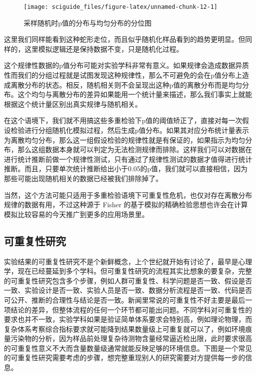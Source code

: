 \documentclass[]{tufte-book}
\begin{document}
\begin{figure}
\texttt{[image: sciguide\_files/figure-latex/unnamed-chunk-12-1]} \caption[采样随机时p值的分布与均匀分布的分位图]{采样随机时p值的分布与均匀分布的分位图}\label{fig:unnamed-chunk-12}
\end{figure}

这里我们同样能看到这种蛇形走位，而且似乎随机化样品看到的趋势更明显。但同样的，这里模拟逻辑还是保持数据不变，只是随机化过程。

这个规律性数据的p值分布可能对实验学科非常有意义。如果规律会造成数据异质性而我们的分组过程就是试图发现这种规律性，那么不可避免的会在p值分布上造成离散分布的状态。相反，随机相关则不会呈现出这种p值的离散分布而是均匀分布。这个均匀与离散分布的差异如果能用一个统计量来描述，那么我们事实上就能根据这个统计量区别出真实规律与随机相关。

在这个语境下，我们就不用搞这些多重检验下p值的阈值矫正了，直接对每一次假设检验进行分组随机化模拟过程，然后生成p值分布。如果其对应分布统计量表示为离散均匀分布，那么这一组假设检验的规律性就是有保证的，如果指示为均匀分布，那么这组数据本身就可以判定为无法检测规律而排除。这样我们可以对数据在进行统计推断前做一个规律性测试，只有通过了规律性测试的数据才值得进行统计推断。而且，只要单次统计推断给出小于0.05的p值，我们就可以直接相信，因为那些可能出现随机相关的数据已经被我们排除掉了。

当然，这个方法可能只适用于多重检验语境下可重复性危机，也仅对存在离散分布规律的数据有用，不过这种源于 Fisher 的基于模拟的精确检验思想也许会在计算模拟比较容易的今天推广到更多的应用场景里。

\hypertarget{ux53efux91cdux590dux6027ux7814ux7a76}{%
\subsection{可重复性研究}\label{ux53efux91cdux590dux6027ux7814ux7a76}}

实验结果的可重复性研究不是个新鲜概念，上个世纪就开始有讨论了，最早是心理学，现在已经蔓延到多个学科。但可重复性研究的流程其实比想象的要复杂，完整的可重复性研究包含多个步骤，例如人群可重复性、科学问题是否一致、假设是否一致、实验设计是否一致、实验人员是否一致、数据分析流程是否一致、代码是否可公开、推断的合理性与结论是否一致。新闻里常说的可重复性不好主要是最后一项结论的差异，但整体流程的任何一个环节都可能出问题。不同学科对可重复性的要求也并不一致，实验学科如果是验证简单体系要求会特别高，例如理论物理，而复杂体系考察综合指标要求就可能降到结果数量级上可重复就可以了，例如环境痕量污染物的分析，因为样品前处理复杂待测物含量经常逼近检出限，此时要求很高的可重复性意义不大而含量数量级通常就能反映足够的环境信息。下图是一个常见的可重复性研究需要考虑的步骤，想完整重现别人的研究需要对方提供每一步的信息。
\end{document}
